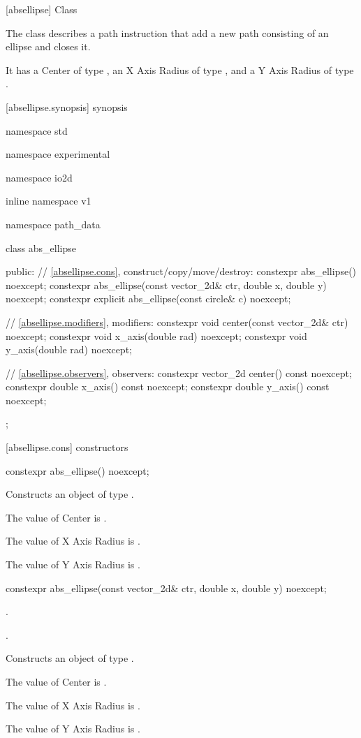 [absellipse] {Class }

\pnum
{}
The class  describes a path instruction that add a new path consisting of an ellipse and closes it.

\pnum
It has a Center of type , an X Axis Radius of type , and a Y Axis Radius of type .

 [absellipse.synopsis] { synopsis}

\begin{codeblock}
namespace std { namespace experimental { namespace io2d { inline namespace v1 {
  namespace path_data {
    class abs_ellipse {
    public:
      // \ref{absellipse.cons}, construct/copy/move/destroy:
      constexpr abs_ellipse() noexcept;
      constexpr abs_ellipse(const vector_2d& ctr, double x, double y) noexcept;
      constexpr explicit abs_ellipse(const circle& c) noexcept;

      // \ref{absellipse.modifiers}, modifiers:
      constexpr void center(const vector_2d& ctr) noexcept;
      constexpr void x_axis(double rad) noexcept;
      constexpr void y_axis(double rad) noexcept;
    
      // \ref{absellipse.observers}, observers:
      constexpr vector_2d center() const noexcept;
      constexpr double x_axis() const noexcept;
      constexpr double y_axis() const noexcept;
    };
  }
} } } }
\end{codeblock}

 [absellipse.cons] { constructors}

\begin{itemdecl}
constexpr abs_ellipse() noexcept;
\end{itemdecl}
\begin{itemdescr}
\pnum
\effects
Constructs an object of type .

\pnum
The value of Center is .

\pnum
The value of X Axis Radius is .

\pnum
The value of Y Axis Radius is .
\end{itemdescr}

\begin{itemdecl}
constexpr abs_ellipse(const vector_2d& ctr, double x, double y) noexcept;
\end{itemdecl}
\begin{itemdescr}
\pnum
\preconditions
{}.

\pnum
{}.

\pnum
\effects
Constructs an object of type .

\pnum
The value of Center is .

\pnum
The value of X Axis Radius is .

\pnum
The value of Y Axis Radius is .
\end{itemdescr}

